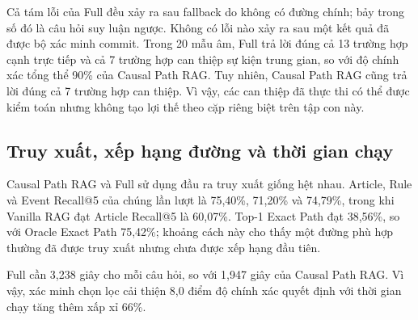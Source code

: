 Cả tám lỗi của Full đều xảy ra sau fallback do không có đường chính; bảy trong
số đó là câu hỏi suy luận ngược. Không có lỗi nào xảy ra sau một kết quả đã
được bộ xác minh commit. Trong 20 mẫu âm, Full trả lời đúng cả 13 trường hợp
cạnh trực tiếp và cả 7 trường hợp can thiệp sự kiện trung gian, so với độ chính
xác tổng thể 90\% của Causal Path RAG. Tuy nhiên, Causal Path RAG cũng trả lời
đúng cả 7 trường hợp can thiệp. Vì vậy, các can thiệp đã thực thi có thể được
kiểm toán nhưng không tạo lợi thế theo cặp riêng biệt trên tập con này.

\subsection{Truy xuất, xếp hạng đường và thời gian chạy}

Causal Path RAG và Full sử dụng đầu ra truy xuất giống hệt nhau. Article,
Rule và Event Recall@5 của chúng lần lượt là 75,40\%, 71,20\% và 74,79\%, trong
khi Vanilla RAG đạt Article Recall@5 là 60,07\%. Top-1 Exact Path đạt 38,56\%,
so với Oracle Exact Path 75,42\%; khoảng cách này cho thấy một đường phù hợp
thường đã được truy xuất nhưng chưa được xếp hạng đầu tiên.

Full cần 3,238 giây cho mỗi câu hỏi, so với 1,947 giây của Causal Path RAG. Vì
vậy, xác minh chọn lọc cải thiện 8,0 điểm độ chính xác quyết định với thời gian
chạy tăng thêm xấp xỉ 66\%.
